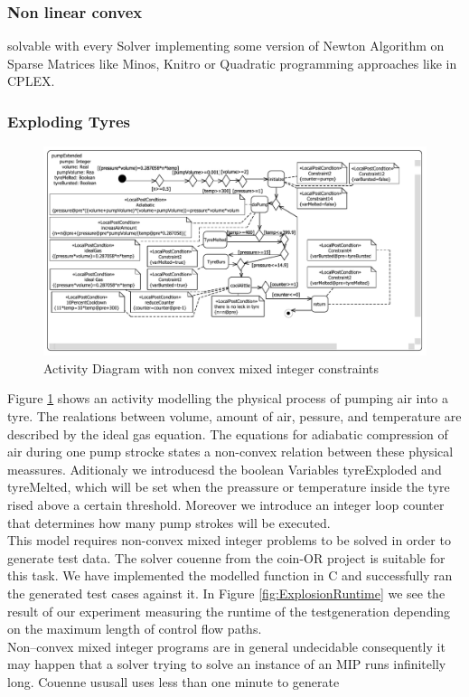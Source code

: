 \subsubsection{Non linear convex}
solvable with every Solver implementing some version of Newton Algorithm on Sparse Matrices like Minos, Knitro or Quadratic programming approaches like in CPLEX.
\subsubsection{Exploding Tyres}
\label{sec:exampleModelNonConvex}
\begin{figure}
\label{fig:pumpTyre}
\includegraphics[width=\textwidth]{./pics/pumpTyre.pdf}
\caption{Activity Diagram with non convex mixed integer constraints}
\end{figure}
Figure \ref{fig:pumpTyre} shows an activity modelling the physical process of pumping air into a tyre. The realations between volume, amount of air, pessure, and temperature are described by the ideal gas equation. The equations for adiabatic compression of air during one pump strocke states a non-convex relation between these physical meassures. Aditionaly we introducesd the boolean Variables tyreExploded and tyreMelted, which will be set when the preassure or temperature inside the tyre rised above a certain threshold. Moreover we introduce an integer loop counter that determines how many pump strokes will be executed.\\
This model requires non-convex mixed integer problems to be solved in order to generate test data. The solver couenne from the coin-OR project is suitable for this task. We have implemented the modelled function in C and successfully ran the generated test cases against it. In Figure \ref{fig:ExplosionRuntime} we see the result of our experiment measuring the runtime of the testgeneration depending on the maximum length of control flow paths.\\
Non--convex mixed integer programs are in general undecidable consequently it may happen that a solver trying to solve an instance of an MIP runs infinitelly long. Couenne ususall uses less than one minute to generate 

